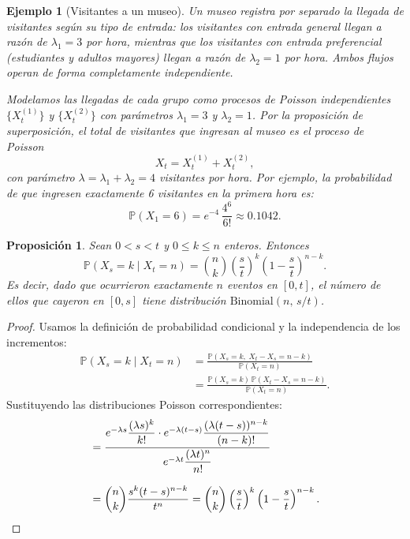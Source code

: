 \documentclass[12pt]{book}
\newtheorem{proposition}{Proposición}[chapter]
\newtheorem{example}{Ejemplo}[chapter]
\begin{document}
\begin{example}[Visitantes a un museo]
Un museo registra por separado la llegada de visitantes según su tipo de entrada: los visitantes con entrada general llegan a razón de $\lambda_1 = 3$ por hora, mientras que los visitantes con entrada preferencial (estudiantes y adultos mayores) llegan a razón de $\lambda_2 = 1$ por hora. Ambos flujos operan de forma completamente independiente.

Modelamos las llegadas de cada grupo como procesos de Poisson independientes $\{X_t^{(1)}\}$ y $\{X_t^{(2)}\}$ con parámetros $\lambda_1 = 3$ y $\lambda_2 = 1$. Por la proposición de superposición, el total de visitantes que ingresan al museo es el proceso de Poisson
\[
    X_t = X_t^{(1)} + X_t^{(2)},
\]
con parámetro $\lambda = \lambda_1 + \lambda_2 = 4$ visitantes por hora. Por ejemplo, la probabilidad de que ingresen exactamente 6 visitantes en la primera hora es:
\[
    \mathbb{P}(X_1 = 6) = e^{-4}\,\frac{4^6}{6!} \approx 0.1042.
\]
\end{example}


\begin{proposition}
Sean $0 < s < t$ y $0 \le k \le n$ enteros. Entonces
\[
    \mathbb{P}(X_s = k \mid X_t = n)
    = \binom{n}{k}\left(\frac{s}{t}\right)^k\left(1 - \frac{s}{t}\right)^{n-k}.
\]
Es decir, dado que ocurrieron exactamente $n$ eventos en $[0, t]$, el número de ellos que cayeron en $[0, s]$ tiene distribución $\mathrm{Binomial}(n,\, s/t)$.
\end{proposition}

\begin{proof}
Usamos la definición de probabilidad condicional y la independencia de los incrementos:
\begin{align*}
    \mathbb{P}(X_s = k \mid X_t = n)
    &= \frac{\mathbb{P}(X_s = k,\; X_t - X_s = n - k)}{\mathbb{P}(X_t = n)} \\[6pt]
    &= \frac{\mathbb{P}(X_s = k)\,\mathbb{P}(X_t - X_s = n-k)}{\mathbb{P}(X_t = n)}.
\end{align*}
Sustituyendo las distribuciones Poisson correspondientes:
\begin{align*}
    &= \frac{e^{-\lambda s}\dfrac{(\lambda s)^k}{k!}\cdot e^{-\lambda(t-s)}\dfrac{(\lambda(t-s))^{n-k}}{(n-k)!}}{e^{-\lambda t}\dfrac{(\lambda t)^n}{n!}} \\[8pt]
    &= \binom{n}{k}\frac{s^k(t-s)^{n-k}}{t^n}
    = \binom{n}{k}\left(\frac{s}{t}\right)^k\left(1-\frac{s}{t}\right)^{n-k}.\qedhere
\end{align*}
\end{proof}
\end{document}
